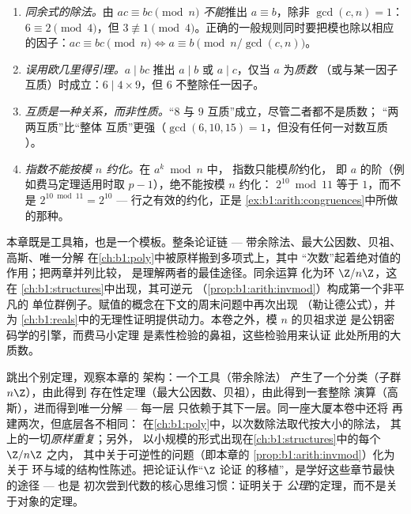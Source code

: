 \begin{remark}[算术中的常见陷阱]\label{rem:b1:arith:pitfalls}
\begin{enumerate}
  \item \emph{同余式的除法。}由 $ac \equiv bc \pmod n$
        \emph{不能}推出 $a \equiv b$，除非 $\gcd(c,
        n) = 1$：$6 \equiv 2 \pmod 4$，但 $3 \not\equiv 1 \pmod
        4$。正确的一般规则同时要把模也除以相应的因子：$ac
        \equiv bc \pmod n \iff a \equiv b \pmod{n/\gcd(c,n)}$。
  \item \emph{误用欧几里得引理。}$a \mid bc$ 推出 $a
        \mid b$ 或 $a \mid c$，仅当 $a$ 为\emph{质数}
        （或与某一因子互质）时成立：$6 \mid 4 \times 9$，但 $6$
        不整除任一因子。
  \item \emph{互质是一种关系，而非性质。}“$8$ 与
        $9$ 互质”成立，尽管二者都不是质数；
        “两两互质”比“整体
        互质”更强（$\gcd(6, 10, 15) = 1$，但没有任何一对数互质
        ）。
  \item \emph{指数不能按模 $n$ 约化。}在 $a^k \bmod n$ 中，
        指数只能模\emph{阶}约化，
        即 $a$ 的阶（例如费马定理适用时取 $p - 1$），绝不能按模 $n$ 约化：
        $2^{10} \bmod 11$ 等于 $1$，而不是 $2^{10 \bmod
        11} = 2^{10}$ --- 行之有效的约化，正是
        \cref{ex:b1:arith:congruences}中所做的那种。
\end{enumerate}
\end{remark}

\begin{remark}[本章的用途]\label{rem:b1:arith:whereused}
本章既是工具箱，也是一个模板。整条论证链
--- 带余除法、最大公因数、贝祖、高斯、唯一分解
在\cref{ch:b1:poly}中被原样搬到多项式上，其中
“次数”起着绝对值的作用；把两章并列比较，
是理解两者的最佳途径。同余运算
化为环 $\Z/n\Z$，这在
\cref{ch:b1:structures}中出现，其可逆元
（\cref{prop:b1:arith:invmod}）构成第一个非平凡的
单位群例子。赋值的概念在下文的周末问题中再次出现
（勒让德公式），并为
\cref{ch:b1:reals}中的无理性证明提供动力。本卷之外，模 $n$ 的贝祖求逆
是公钥密码学的引擎，而费马小定理
是素性检验的鼻祖，这些检验用来认证
此处所用的大质数。
\end{remark}

\begin{remark}[插曲：作为模板的 $\Z$]\label{rem:b1:arith:interlude}
跳出个别定理，观察本章的
架构：一个工具（带余除法）
产生了一个分类（子群 $n\Z$），由此得到
存在性定理（最大公因数、贝祖），由此得到一套整除
演算（高斯），进而得到唯一分解 --- 每一层
只依赖于其下一层。同一座大厦本卷中还将
再建两次，但底层各不相同：
在\cref{ch:b1:poly}中，以次数除法取代按大小的除法，
其上的一切\emph{原样重复}；另外，
以小规模的形式出现在\cref{ch:b1:structures}中的每个 $\Z/n\Z$ 之内，
其中关于可逆性的问题（即本章的
\cref{prop:b1:arith:invmod}）化为关于
环与域的结构性陈述。把论证认作“$\Z$ 论证
的移植”，是学好这些章节最快的途径 --- 也是
初次尝到代数的核心思维习惯：证明关于
\emph{公理}的定理，而不是关于对象的定理。
\end{remark}

